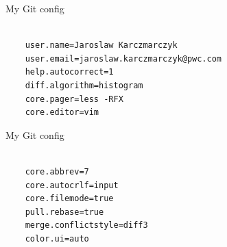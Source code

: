 \documentclass{beamer}
\begin{document}
    \begin{frame}[fragile]{My Git config}
        \begin{verbatim}

    user.name=Jaroslaw Karczmarczyk
    user.email=jaroslaw.karczmarczyk@pwc.com
    help.autocorrect=1
    diff.algorithm=histogram
    core.pager=less -RFX
    core.editor=vim
        \end{verbatim}
    \end{frame}

    \begin{frame}[fragile]{My Git config}
        \begin{verbatim}

    core.abbrev=7
    core.autocrlf=input
    core.filemode=true
    pull.rebase=true
    merge.conflictstyle=diff3
    color.ui=auto
        \end{verbatim}
    \end{frame}
\end{document}

